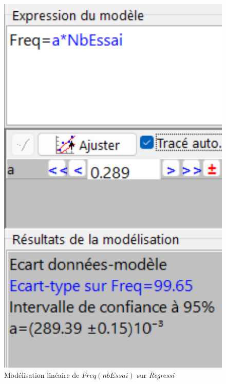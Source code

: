 \documentclass{report}
\begin{document}
\newpage


\begin{figure}[H]
	\centering
	\includegraphics[scale=0.5]{../graphe/ValdeP.png}
	\caption{Modélisation linéaire de $Freq(nbEssai)$ sur \textit{Regressi}}
\end{figure}
\end{document}
